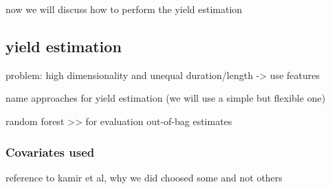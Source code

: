 now we will discuss how to perform the yield estimation
\subsection{yield estimation}
problem: high dimensionality and unequal duration/length -> use features

name approaches for yield estimation (we will use a simple but flexible one)

random forest >> for evaluation out-of-bag estimates
\subsubsection{Covariates used}
reference to kamir et al, why we did choosed some and not others



